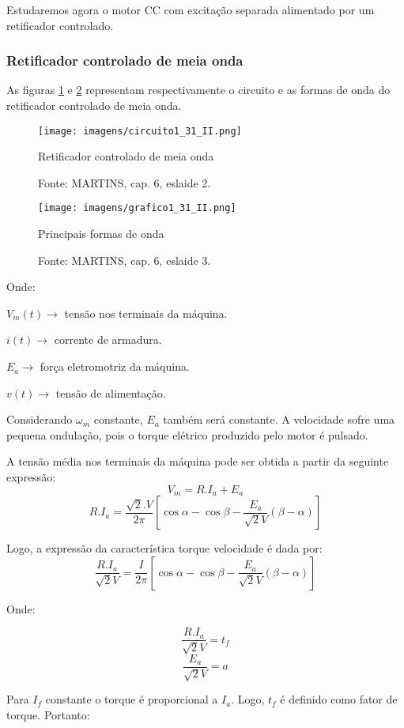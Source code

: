 Estudaremos agora o motor CC com excitação separada alimentado por um retificador controlado.

\subsubsection{Retificador controlado de meia onda}

As figuras \ref{fig:C1-31-II} e \ref{fig:G1-31-II} representam respectivamente o circuito e as formas de onda do retificador controlado de meia onda.
 
 \begin{figure}[ht!]
\center
\texttt{[image: imagens/circuito1\_31\_II.png]}
\caption{\label{fig:C1-31-II}Retificador controlado de meia onda}
\caption*{Fonte: MARTINS, cap. 6, eslaide 2.}
\end{figure}

\begin{figure}[ht!]
\center
\texttt{[image: imagens/grafico1\_31\_II.png]}
\caption{\label{fig:G1-31-II}Principais formas de onda}
\caption*{Fonte: MARTINS, cap. 6, eslaide 3.}
\end{figure}

Onde:

$V_{m}(t) \rightarrow$ tensão nos terminais da máquina.

$i(t) \rightarrow$ corrente de armadura.

$E_{a} \rightarrow$ força eletromotriz da máquina.

$v(t) \rightarrow$ tensão de alimentação.

Considerando $\omega_{m}$ constante, $E_{a}$ também será constante. A velocidade sofre uma pequena ondulação, pois o torque elétrico produzido pelo motor é pulsado. 

A tensão média nos terminais da máquina pode ser obtida a partir da seguinte expressão:
\[V_{m} = R.I_{a} + E_{a}\]
\[R.I_{a} = \frac{\sqrt{2}.V}{2\pi}\left[\cos{\alpha} - \cos{\beta} - \frac{E_{a}}{\sqrt{2}V}\left(\beta - \alpha\right)\right]\]

Logo, a expressão da característica torque velocidade é dada por:
\[\frac{R.I_{a}}{\sqrt{2}V}  = \frac{I}{2\pi}\left[\cos{\alpha} - \cos{\beta} - \frac{E_{a}}{\sqrt{2}V}\left(\beta - \alpha\right)\right]\]

Onde:

\[\frac{R.I_{a}}{\sqrt{2}V} = t_{f}\]
\[\frac{E_{a}}{\sqrt{2}V} = a\]

Para $I_{f}$ constante o torque é proporcional a $I_{a}$. Logo, $t_{f}$ é definido como fator de torque. Portanto:

